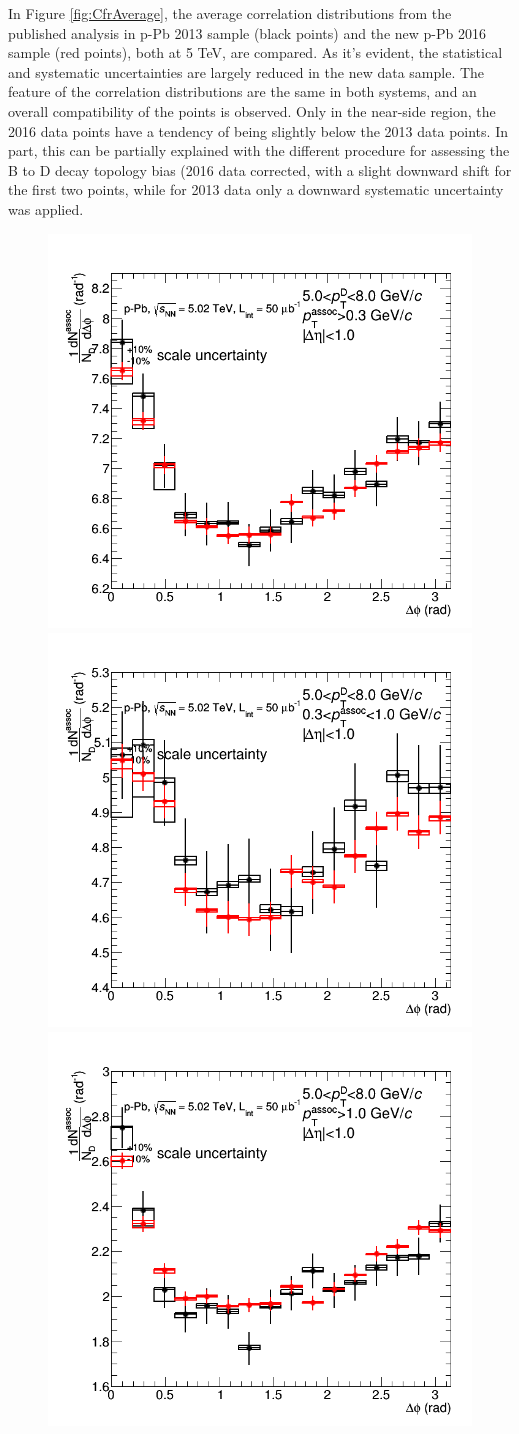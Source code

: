 In Figure \ref{fig:CfrAverage}, the average correlation distributions from the published analysis in p-Pb 2013 sample (black points) and the new p-Pb 2016 sample (red points), both at 5 TeV, are compared. As it's evident, the statistical and systematic uncertainties are largely reduced in the new data sample. The feature of the correlation distributions are the same in both systems, and an overall compatibility of the points is observed. Only in the near-side region, the 2016 data points have a tendency of being slightly below the 2013 data points. In part, this can be partially explained with the different procedure for assessing the B to D decay topology bias (2016 data corrected, with a slight downward shift for the first two points, while for 2013 data only a downward systematic uncertainty was applied.

\begin{figure}[!htbp]
\centering
\centering
{\includegraphics[width=0.47\linewidth]{figures/Cfr2013vs2016/Average_Cfr_2013_2016_Pt5to8_Thr03to99.png}}
{\includegraphics[width=0.47\linewidth]{figures/Cfr2013vs2016/Average_Cfr_2013_2016_Pt5to8_Thr03to1.png}}
{\includegraphics[width=0.47\linewidth]{figures/Cfr2013vs2016/Average_Cfr_2013_2016_Pt5to8_Thr1to99.png}}

\end{figure}
